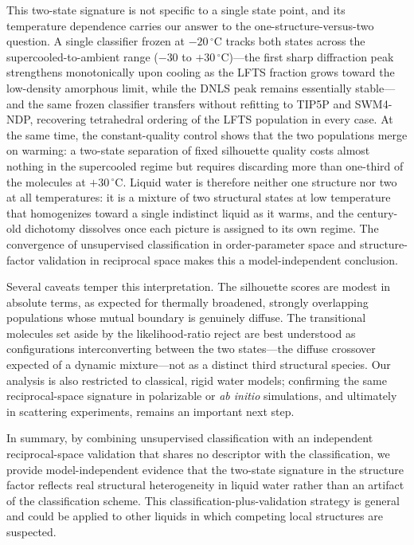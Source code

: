 \documentclass[aps, amsmath,amssymb, reprint, twocolumn, superscriptaddress]{revtex4-2}
\begin{document}
This two-state signature is not specific to a single state point, and its temperature dependence carries our answer to the one-structure-versus-two question. A single classifier frozen at $-20\,^\circ$C tracks both states across the supercooled-to-ambient range ($-30$ to $+30\,^\circ$C)---the first sharp diffraction peak strengthens monotonically upon cooling as the LFTS fraction grows toward the low-density amorphous limit, while the DNLS peak remains essentially stable---and the same frozen classifier transfers without refitting to TIP5P and SWM4-NDP, recovering tetrahedral ordering of the LFTS population in every case. At the same time, the constant-quality control shows that the two populations merge on warming: a two-state separation of fixed silhouette quality costs almost nothing in the supercooled regime but requires discarding more than one-third of the molecules at $+30\,^\circ$C. Liquid water is therefore neither one structure nor two at all temperatures: it is a mixture of two structural states at low temperature that homogenizes toward a single indistinct liquid as it warms, and the century-old dichotomy dissolves once each picture is assigned to its own regime. The convergence of unsupervised classification in order-parameter space and structure-factor validation in reciprocal space makes this a model-independent conclusion.

Several caveats temper this interpretation. The silhouette scores are modest in absolute terms, as expected for thermally broadened, strongly overlapping populations whose mutual boundary is genuinely diffuse. The transitional molecules set aside by the likelihood-ratio reject are best understood as configurations interconverting between the two states---the diffuse crossover expected of a dynamic mixture---not as a distinct third structural species. Our analysis is also restricted to classical, rigid water models; confirming the same reciprocal-space signature in polarizable or \emph{ab initio} simulations, and ultimately in scattering experiments, remains an important next step.

In summary, by combining unsupervised classification with an independent reciprocal-space validation that shares no descriptor with the classification, we provide model-independent evidence that the two-state signature in the structure factor reflects real structural heterogeneity in liquid water rather than an artifact of the classification scheme. This classification-plus-validation strategy is general and could be applied to other liquids in which competing local structures are suspected.
\end{document}
